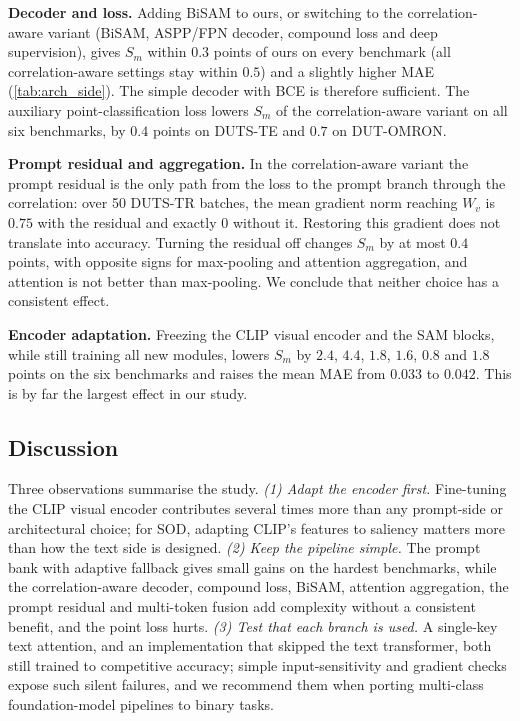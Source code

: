 \begin{revpar}
\noindent\textbf{Decoder and loss.} Adding BiSAM to ours, or switching to the
correlation-aware variant (BiSAM, ASPP/FPN decoder, compound loss and deep
supervision), gives $S_m$ within $0.3$ points of ours on every benchmark (all
correlation-aware settings stay within $0.5$) and a slightly higher MAE
(\cref{tab:arch_side}). The simple decoder with BCE is therefore sufficient. The
auxiliary point-classification loss lowers $S_m$ of the correlation-aware variant
on all six benchmarks, by $0.4$ points on DUTS-TE and $0.7$ on DUT-OMRON.

\noindent\textbf{Prompt residual and aggregation.} In the correlation-aware variant
the prompt residual is the only path from the loss to the prompt branch through the
correlation: over 50 DUTS-TR batches, the mean gradient norm reaching $W_v$ is
$0.75$ with the residual and exactly $0$ without it. Restoring this gradient does
not translate into accuracy. Turning the residual off changes $S_m$ by at most
$0.4$ points, with opposite signs for max-pooling and attention aggregation, and
attention is not better than max-pooling. We conclude that neither choice has a
consistent effect.

\noindent\textbf{Encoder adaptation.} Freezing the CLIP visual encoder and the SAM
blocks, while still training all new modules, lowers $S_m$ by $2.4$, $4.4$, $1.8$,
$1.6$, $0.8$ and $1.8$ points on the six benchmarks and raises the mean MAE from
$0.033$ to $0.042$. This is by far the largest effect in our study.
\end{revpar}

\subsection{Discussion}
\label{sec:discussion}

\begin{revpar}
Three observations summarise the study. \emph{(1) Adapt the encoder first.}
Fine-tuning the CLIP visual encoder contributes several times more than any
prompt-side or architectural choice; for SOD, adapting CLIP's features to
saliency matters more than how the text side is designed. \emph{(2) Keep the
pipeline simple.} The prompt bank with adaptive fallback gives small gains on the
hardest benchmarks, while the correlation-aware decoder, compound loss, BiSAM,
attention aggregation, the prompt residual and multi-token fusion add complexity
without a consistent benefit, and the point loss hurts. \emph{(3) Test that each
branch is used.} A single-key text attention, and an implementation that skipped
the text transformer, both still trained to competitive accuracy; simple
input-sensitivity and gradient checks expose such silent failures, and we
recommend them when porting multi-class foundation-model pipelines to binary tasks.
\end{revpar}

